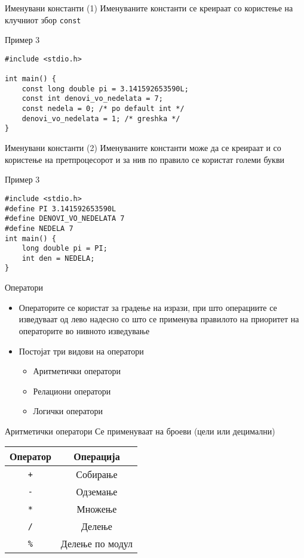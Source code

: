 \begin{frame}[fragile]{Именувани константи (1)}
\Large{Именуваните константи се креираат со користење на клучниот збор \texttt{const}}
\begin{exampleblock}{Пример 3}
\begin{lstlisting}
#include <stdio.h>

int main() {
    const long double pi = 3.141592653590L;
    const int denovi_vo_nedelata = 7;
    const nedela = 0; /* po default int */
    denovi_vo_nedelata = 1; /* greshka */
}
\end{lstlisting}
    \end{exampleblock}
\end{frame}

\begin{frame}[fragile]{Именувани константи (2)}
Именуваните константи може да се креираат и со користење на претпроцесорот и за нив по правило се користат големи букви
    \begin{exampleblock}{Пример 3}
\begin{lstlisting}
#include <stdio.h>
#define PI 3.141592653590L
#define DENOVI_VO_NEDELATA 7
#define NEDELA 7        
int main() {
    long double pi = PI;
    int den = NEDELA;
}
\end{lstlisting}
    \end{exampleblock}
\end{frame}

\begin{frame}{Оператори}
\begin{itemize}
\item Операторите се користат за градење на изрази, при што операциите се изведуваат од лево надесно со што се применува правилото на приоритет на операторите во нивното изведување
\item Постојат три видови на оператори
\begin{itemize}
\item Аритметички оператори
\item Релациони оператори
\item Логички оператори
\end{itemize}
\end{itemize}
\end{frame}

\begin{frame}{Аритметички оператори}
Се применуваат на броеви (цели или децимални)
\linebreak
\begin{center}
\begin{tabular}{c|c}
\textbf{Оператор} & \textbf{Операција}\\
\hline
\texttt{+} & Собирање \\
\texttt{-} & Одземање \\
\texttt{*} & Множење \\
\texttt{/} & Делење \\
\texttt{\%} & Делење по модул
\end{tabular}
\end{center}
\end{frame}

